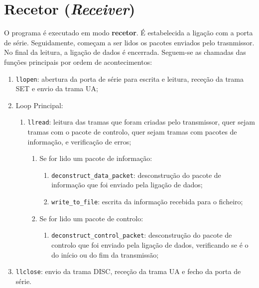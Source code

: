 \documentclass[article, a4paper, 11pt, oneside]{memoir}
\begin{document}
\section{Recetor (\textit{Receiver})}

O programa é executado em modo \textbf{recetor}. É estabelecida a ligação com a porta de série.
Seguidamente, começam a ser lidos os pacotes enviados pelo trasnmissor. No final da leitura,
a ligação de dados é encerrada. Seguem-se as chamadas das funções principais por ordem de 
acontecimentos:
\begin{enumerate}
    \item \verb|llopen|: abertura da porta de série para escrita e leitura, receção da trama SET e 
    envio da trama UA;
    \item Loop Principal:
    \begin{enumerate}
        \item \verb|llread|: leitura das tramas que foram criadas pelo transmissor, quer sejam tramas com
        o pacote de controlo, quer sejam tramas com pacotes de informação, e verificação de erros;
        \begin{enumerate}
            \item Se for lido um pacote de informação:
            \begin{enumerate}
                \item \verb|deconstruct_data_packet|: desconstrução do pacote de informação que foi enviado
                pela ligação de dados;
                \item \verb|write_to_file|: escrita da informação recebida para o ficheiro;
            \end{enumerate}
            \item Se for lido um pacote de controlo:
            \begin{enumerate}
                \item \verb|deconstruct_control_packet|: desconstrução do pacote de controlo que foi enviado
                pela ligação de dados, verificando se é o do início ou do fim da transmissão;
            \end{enumerate}
        \end{enumerate}
    \end{enumerate}
    \item \verb|llclose|: envio da trama DISC, receção da trama UA e fecho da porta de série.
\end{enumerate}

\end{document}
